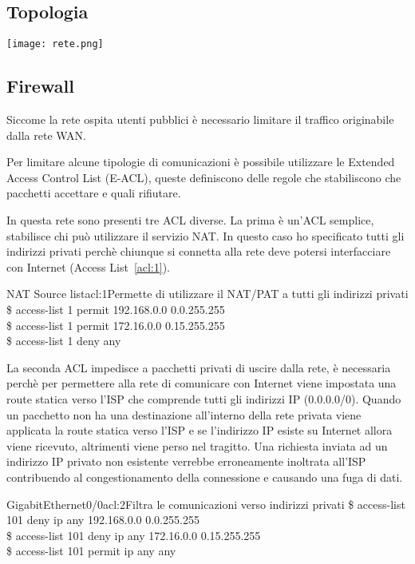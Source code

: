 \begin{landscape}
    \subsection{Topologia}%
    \label{sub:topologia}
    \thispagestyle{empty}
    \texttt{[image: rete.png]}
\end{landscape}

\subsection{Firewall}
Siccome la rete ospita utenti pubblici \`e necessario limitare il traffico originabile dalla rete WAN\@.

Per limitare alcune tipologie di comunicazioni \`e possibile utilizzare le Extended Access Control List (E-ACL), queste definiscono delle regole che stabiliscono che pacchetti accettare e quali rifiutare.

In questa rete sono presenti tre ACL diverse. La prima \`e un'ACL semplice, stabilisce chi pu\`o utilizzare il servizio NAT\@. In questo caso ho specificato tutti gli indirizzi privati perch\`e chiunque si connetta alla rete deve potersi interfacciare con Internet (Access List~\ref{acl:1}).

\begin{cmds}[inside]{NAT Source list}{acl:1}{Permette di utilizzare il NAT/PAT a tutti gli indirizzi privati}
    \$ access-list 1 permit 192.168.0.0 0.0.255.255\\
    \$ access-list 1 permit 172.16.0.0 0.15.255.255\\
    \$ access-list 1 deny any
\end{cmds}

La seconda ACL impedisce a pacchetti privati di uscire dalla rete, \`e necessaria perch\`e per permettere alla rete di comunicare con Internet viene impostata una route statica verso l'ISP che comprende tutti gli indirizzi IP (0.0.0.0/0). Quando un pacchetto non ha una destinazione all'interno della rete privata viene applicata la route statica verso l'ISP e se l'indirizzo IP esiste su Internet allora viene ricevuto, altrimenti viene perso nel tragitto. Una richiesta inviata ad un indirizzo IP privato non esistente verrebbe erroneamente inoltrata all'ISP contribuendo al congestionamento della connessione e causando una fuga di dati. 

\begin{cmds}[out]{GigabitEthernet0/0}{acl:2}{Filtra le comunicazioni verso indirizzi privati}
    \$ access-list 101 deny ip any 192.168.0.0 0.0.255.255\\
    \$ access-list 101 deny ip any 172.16.0.0 0.15.255.255\\
    \$ access-list 101 permit ip any any
\end{cmds}

